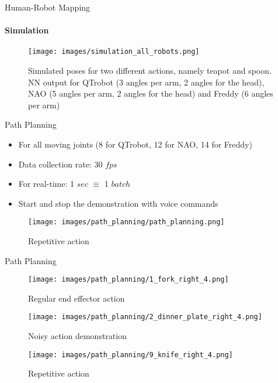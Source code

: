 \documentclass[aspectratio=169]{beamer}
\begin{document}
\begin{frame}{Human-Robot Mapping}
	\framesubtitle{Simulation}
	\begin{figure}[h]
		\centering
		\texttt{[image: images/simulation\_all\_robots.png]}
		\label{fig:simulation_teapot}
		\caption{Simulated poses for two different actions, namely teapot and spoon. NN output for QTrobot (3 angles per arm, 2 angles for the head), NAO (5 angles per arm, 2 angles for the head) and Freddy (6 angles per arm)}
	\end{figure}
\end{frame}

\begin{frame}{Path Planning}
	\begin{minipage}{0.49\linewidth}	
	\vspace{-2cm}
	\begin{itemize}
		\item For all moving joints (8 for QTrobot, 12 for NAO, 14 for Freddy)
		\newline
		\item Data collection rate: 30 $fps$
		\newline
		\item For real-time: 1 $sec$ $\equiv$ 1 $batch$	
		\newline
		\item Start and stop the demonstration with voice commands
	\end{itemize}
	\end{minipage}		
	\begin{minipage}{0.49\linewidth}	
		\begin{figure}[h!]
		\texttt{[image: images/path\_planning/path\_planning.png]}
		\caption{Repetitive action}
	\end{figure}
\end{minipage}
\end{frame}

\begin{frame}{Path Planning}
	\begin{minipage}{0.32\linewidth}	
		\begin{figure}[h!]
			\texttt{[image: images/path\_planning/1\_fork\_right\_4.png]}
			\caption{Regular end effector action}
		\end{figure}
	\end{minipage}		
	\begin{minipage}{0.32\linewidth}	
		\begin{figure}[h!]
			\texttt{[image: images/path\_planning/2\_dinner\_plate\_right\_4.png]}
			\caption{Noisy action demonstration}
		\end{figure}
	\end{minipage}	
	\begin{minipage}{0.32\linewidth}	
	\begin{figure}[h!]
		\texttt{[image: images/path\_planning/9\_knife\_right\_4.png]}
		\caption{Repetitive action}
	\end{figure}
	\end{minipage}
\end{frame}
\end{document}
